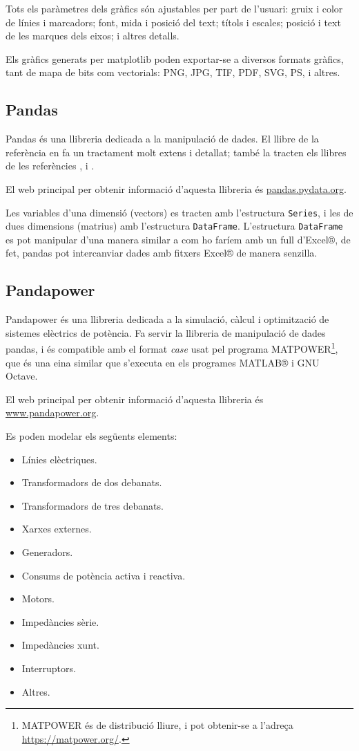 Tots els paràmetres dels gràfics són ajustables per part de l'usuari: gruix i color de línies i marcadors; font, mida i posició  del text;  títols i escales; posició i text de les marques dels eixos; i altres detalls.

Els gràfics generats per matplotlib poden exportar-se a diversos formats gràfics, tant de mapa de bits com vectorials: PNG, JPG, TIF, PDF, SVG, PS, i altres.



\subsection{Pandas}

Pandas és una llibreria dedicada a la manipulació de dades.  El llibre de la referència \cite{VAN} en fa un tractament molt extens i detallat; també la tracten els llibres de les referències \cite{JOH}, \cite{HIL} i \cite{ZUM}.


El  web principal per obtenir informació d'aquesta llibreria és \href{https://pandas.pydata.org/}{pandas.pydata.org}.

Les variables d'una dimensió (vectors) es tracten amb l'estructura \texttt{Series}, i les de dues dimensions (matrius) amb l'estructura \texttt{DataFrame}. L'estructura \texttt{DataFrame} es pot manipular d'una manera similar a com ho faríem amb un full d'Excel®, de fet, pandas pot intercanviar dades amb fitxers Excel® de manera senzilla.


\subsection{Pandapower}

Pandapower és una llibreria dedicada a la simulació, càlcul i optimització de sistemes elèctrics de potència.  Fa servir la llibreria de manipulació de dades pandas, i és compatible amb el format \textit{case} usat pel programa MATPOWER\footnote{MATPOWER és de distribució lliure, i pot obtenir-se a l'adreça \href{https://matpower.org/}{https://matpower.org/}.}, que és una eina similar que s'executa en els programes MATLAB® i GNU Octave.

El  web principal per obtenir informació d'aquesta llibreria és \href{https://www.pandapower.org/}{www.pandapower.org}.

Es poden modelar els següents elements:
\begin{itemize}
	\item Línies elèctriques.
	\item Transformadors de dos debanats.
	\item Transformadors de tres debanats.
	\item Xarxes externes.
	\item Generadors.
	\item Consums de potència activa i reactiva.
	\item Motors.
	\item Impedàncies sèrie.
	\item Impedàncies xunt.
	\item Interruptors.
	\item Altres.
\end{itemize}

